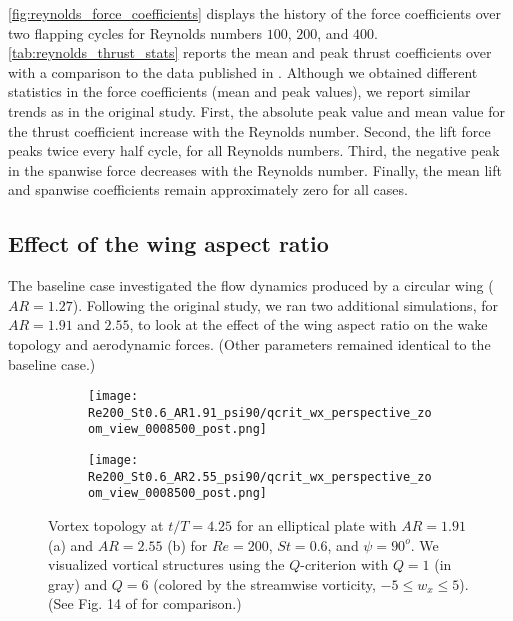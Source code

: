 \cref{fig:reynolds_force_coefficients} displays the history of the force coefficients over two flapping cycles for Reynolds numbers $100$, $200$, and $400$.
\cref{tab:reynolds_thrust_stats} reports the mean and peak thrust coefficients over with a comparison to the data published in \citet{li_dong_2016}.
Although we obtained different statistics in the force coefficients (mean and peak values), we report similar trends as in the original study.
First, the absolute peak value and mean value for the thrust coefficient increase with the Reynolds number.
Second, the lift force peaks twice every half cycle, for all Reynolds numbers.
Third, the negative peak in the spanwise force decreases with the Reynolds number.
Finally, the mean lift and spanwise coefficients remain approximately zero for all cases.

\subsection{Effect of the wing aspect ratio}

The baseline case investigated the flow dynamics produced by a circular wing ($AR = 1.27$).
Following the original study, we ran two additional simulations, for $AR = 1.91$ and $2.55$, to look at the effect of the wing aspect ratio on the wake topology and aerodynamic forces.
(Other parameters remained identical to the baseline case.)

\begin{figure}[!h]
  \centering
  \begin{subfigure}[c]{0.45\textwidth}
    \centering
    \texttt{[image: Re200\_St0.6\_AR1.91\_psi90/qcrit\_wx\_perspective\_zoom\_view\_0008500\_post.png]}
    \caption{}
    \label{fig:ratio_wake_topology:1.91_perspective}
  \end{subfigure}
  \hfill
  \begin{subfigure}[c]{0.45\textwidth}
    \centering
    \texttt{[image: Re200\_St0.6\_AR2.55\_psi90/qcrit\_wx\_perspective\_zoom\_view\_0008500\_post.png]}
    \caption{}
    \label{fig:ratio_wake_topology:2.55_perspective}
  \end{subfigure}
  \caption{Vortex topology at $t / T = 4.25$ for an elliptical plate with $AR = 1.91$ (a) and $AR = 2.55$ (b) for $Re = 200$, $St = 0.6$, and $\psi = 90^o$. We visualized vortical structures using the $Q$-criterion with $Q = 1$ (in gray) and $Q = 6$ (colored by the streamwise vorticity, $-5 \leq w_x \leq 5$). (See Fig. 14 of \citet{li_dong_2016} for comparison.)}
  \label{fig:ratio_wake_topology}
\end{figure}

